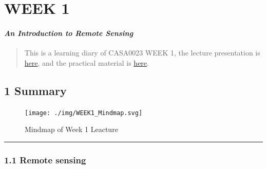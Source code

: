 \documentclass[
  letterpaper,
  DIV=11,
  numbers=noendperiod]{scrreprt}
\begin{document}

\hypertarget{week-1}{%
\chapter*{\texorpdfstring{\textbf{WEEK 1}}{WEEK 1}}\label{week-1}}

\hypertarget{an-introduction-to-remote-sensing}{%
\subsubsection*{\texorpdfstring{\textbf{\emph{An Introduction to Remote
Sensing}}}{An Introduction to Remote Sensing}}\label{an-introduction-to-remote-sensing}}

\begin{quote}
This is a learning diary of CASA0023 WEEK 1, the lecture presentation is
\href{https://andrewmaclachlan.github.io/CASA0023-lecture-1/\#1}{here},
and the practical material is
\href{https://andrewmaclachlan.github.io/CASA0023/intro.html}{here}.
\end{quote}

\hypertarget{summary}{%
\section*{\texorpdfstring{\textbf{1
Summary}}{1 Summary}}\label{summary}}

\begin{figure}

{\centering \texttt{[image: ./img/WEEK1\_Mindmap.svg]}

}

\caption{Mindmap of Week 1 Leacture}

\end{figure}

\begin{center}\rule{0.5\linewidth}{0.5pt}\end{center}

\hypertarget{remote-sensing}{%
\subsection*{\texorpdfstring{\textbf{1.1 Remote
sensing}}{1.1 Remote sensing}}\label{remote-sensing}}
\end{document}
